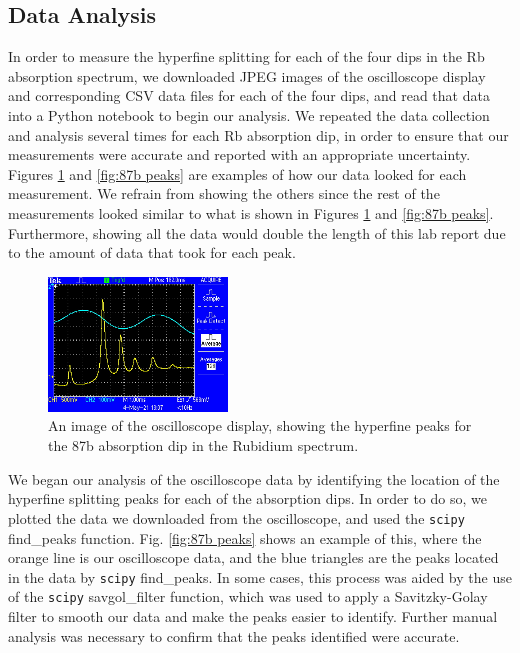 \documentclass[twocolumn,amsmath,amssymb,pra, floatfix]{revtex4-2}
\begin{document}
\subsection{Data Analysis}
\label{sec:data analysis}
In order to measure the hyperfine splitting for each of the four dips in the Rb absorption spectrum, we downloaded JPEG images of the oscilloscope display and corresponding CSV data files for each of the four dips, and read that data into a Python notebook to begin our analysis. We repeated the data collection and analysis several times for each Rb absorption dip, in order to ensure that our measurements were accurate and reported with an appropriate uncertainty. Figures \ref{87b oscilloscope} and \ref{fig:87b peaks} are examples of how our data looked for each measurement. We refrain from showing the others since the rest of the measurements looked similar to what is shown in Figures \ref{87b oscilloscope} and \ref{fig:87b peaks}. Furthermore, showing all the data would double the length of this lab report due to the amount of data that took for each peak.

\begin{figure}
    \centering
    \includegraphics[width=0.425\textwidth]{figures/87b_1.JPG}
    \caption{An image of the oscilloscope display, showing the hyperfine peaks for the 87b absorption dip in the Rubidium spectrum.}
    \label{87b oscilloscope}
\end{figure}

We began our analysis of the oscilloscope data by identifying the location of the hyperfine splitting peaks for each of the absorption dips. In order to do so, we plotted the data we downloaded from the oscilloscope, and used the \texttt{scipy} find\_peaks function. Fig. \ref{fig:87b peaks} shows an example of this, where the orange line is our oscilloscope data, and the blue triangles are the peaks located in the data by \texttt{scipy} find\_peaks. In some cases, this process was aided by the use of the \texttt{scipy} savgol\_filter function, which was used to apply a Savitzky-Golay filter to smooth our data and make the peaks easier to identify. Further manual analysis was necessary to confirm that the peaks identified were accurate.
\end{document}
